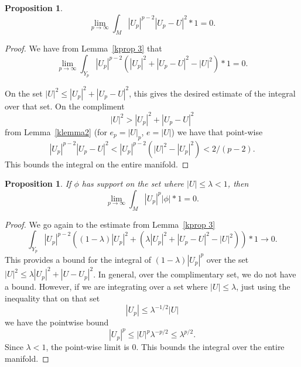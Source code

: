 \documentclass{ip-journal}
\newtheorem{proposition}[theorem]{Proposition}
\newtheorem{corollary}[theorem]{Corollary}
\theoremstyle{definition}
\numberwithin{equation}{section}
\begin{document}
\begin{proposition} \label{kprop 4}  
\[
\lim_{p\rightarrow \infty}\int_M |U_p|^{p-2}|U_p - U|^2 *1 = 0.
\]
\end{proposition}

\begin{proof}   We have from Lemma~\ref{kprop 3} that
\[
\lim_{p\rightarrow \infty} \int_{Y_p} |U_p|^{p-2}(|U_p|^2 +|U_p -U|^2-|U|^2)*1  = 0.
\]

On the set ${|U|^2 \leq |U_p|^2 + |U_p -U|^2}$, this gives the desired estimate of the integral over that set.
On the compliment
 \[
 {|U|^2 > |U_p|^2 + |U_p-U|^2}
 \]  
 from Lemma~\ref{klemma2} (for $e_p=|U|_p$,  $e=|U|$)  we have that point-wise
\[
|U_p|^{p-2}|U_p - U|^2 < |U_p|^{p-2}(|U|^2 -|U_p|^2) < 2/(p-2).
\]
This bounds the integral on the entire manifold.
\end{proof}

% 
   

         



\begin{proposition} \label{prop:supptmeasure0}   If $\phi$ has support on the set where $|U| \leq \lambda < 1$, then
\[
\lim_{p\rightarrow \infty} \int_M |U_p|^p| \phi| *1 = 0.
 \]
\end{proposition}
\begin{proof} 
We go again to the estimate from Lemma~\ref{kprop 3} 
\[
\int_{Y_p} |U_p|^{p-2}\left((1-\lambda)|U_p|^2 +( \lambda|U_p|^2 +|U_p-U|^2 - |U|^2) \right )*1 \rightarrow 0.
\]
This provides a bound for the 
 integral of $(1 -\lambda)|U_p|^p$ over the set $|U|^2 \leq \lambda|U_p|^2 + |U-U_p|^2$.   In general, over the complimentary set, we do not have a bound.  However, if we are integrating over a set where  $|U| \leq \lambda$, just using the inequality that on that set 
 \[
 |U_p| \leq  \lambda^{-1/2} |U|
 \] 
 we have the pointwise bound
\[ 
|U_p|^p \leq |U|^p \lambda^{-p/2} \leq \lambda^{p/2}.
\]
Since $\lambda < 1$, the point-wise limit is 0. This bounds the integral over the entire manifold.
\end{proof}
\end{document}
